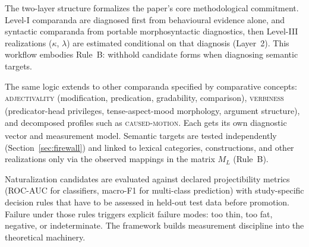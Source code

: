 \documentclass[12pt]{article}
\begin{document}
The two-layer structure formalizes the paper's core methodological commitment. Level-I comparanda are diagnosed first from behavioural evidence alone, and syntactic comparanda from portable morphosyntactic diagnostics, then Level-III realizations ($\kappa$, $\lambda$) are estimated conditional on that diagnosis (Layer~2). This workflow embodies Rule~B: withhold candidate forms when diagnosing semantic targets.

The same logic extends to other comparanda specified by comparative concepts: \textsc{adjectivality}\textsubscript{\Cross} (modification, predication, gradability, comparison), \textsc{verbiness}\textsubscript{\Cross} (predicator-head privileges, tense-aspect-mood morphology, argument structure), and decomposed profiles such as \textsc{caused-motion}\textsubscript{\Cross}. Each gets its own diagnostic vector and measurement model. Semantic targets are tested independently (Section~\ref{sec:firewall}) and linked to lexical categories, constructions, and other realizations only via the observed mappings in the matrix $M_L$ (Rule~B).

Naturalization candidates are evaluated against declared projectibility metrics (ROC-AUC for classifiers, macro-F1 for multi-class prediction) with study-specific decision rules that have to be assessed in held-out test data before promotion. Failure under those rules triggers explicit failure modes: too thin, too fat, negative, or indeterminate. The framework builds measurement discipline into the theoretical machinery.




\clearpage
\printbibliography
\end{document}
